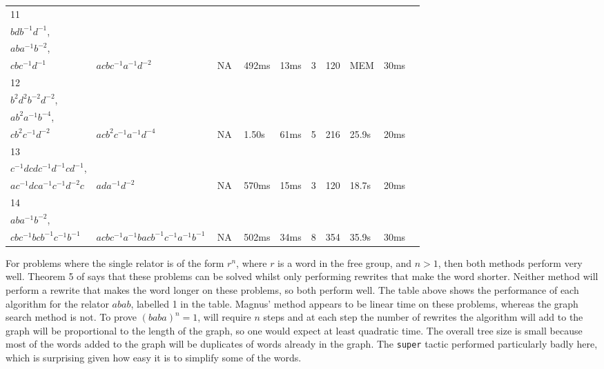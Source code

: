 \documentclass[12pt]{article} %
\theoremstyle{definition}
\theoremstyle{definition}
\theoremstyle{definition}
\theoremstyle{definition}
\begin{document}
\begin{landscape}
\begin{longtable}[!h]{l|l|l|lll|llll|l|l}
  11 & \begin{tabular}[c]{@{}l@{}}$aca^{-1}c^{-1}$,\\ $bdb^{-1}d^{-1}$,\\ $aba^{-1}b^{-2}$,\\ $cbc^{-1}d^{-1}$\end{tabular} & $acbc^{-1}a^{-1}d^{-2}$ & \multicolumn{3}{c|}{NA} & 492ms & 13ms & 3 & 120 & MEM & 30ms \\ \hline
  12 & \begin{tabular}[c]{@{}l@{}}$aca^{-1}c^{-1}$,\\ $b^2d^2b^{-2}d^{-2}$,\\ $ab^2a^{-1}b^{-4}$,\\ $cb^2c^{-1}d^{-2}$\end{tabular} & $acb^2c^{-1}a^{-1}d^{-4}$ & \multicolumn{3}{c|}{NA} & 1.50s & 61ms & 5 & 216 & 25.9s & 20ms \\ \hline
  13 & \begin{tabular}[c]{@{}l@{}}$aca^{-1}c^{-1}$,\\ $c^{-1}dcdc^{-1}d^{-1}cd^{-1}$,\\ $ac^{-1}dca^{-1}c^{-1}d^{-2}c$\end{tabular} & $ada^{-1}d^{-2}$ & \multicolumn{3}{c|}{NA} & 570ms & 15ms & 3 & 120 & 18.7s & 20ms \\ \hline
  14 & \begin{tabular}[c]{@{}l@{}}$aca^{-1}c^{-1}$,\\ $aba^{-1}b^{-2}$,\\ $cbc^{-1}bcb^{-1}c^{-1}b^{-1}$\end{tabular} & $acbc^{-1}a^{-1}bacb^{-1}c^{-1}a^{-1}b^{-1}$ & \multicolumn{3}{c|}{NA} & 502ms & 34ms & 8 & 354 & 35.9s & 30ms
  \label{tab:my-table}\\
  \end{longtable}
\end{landscape}
\pagebreak

For problems where the single relator is of the form $r^n$, where
$r$ is a word in the free group, and $n > 1$, then both methods perform
very well. Theorem 5 of \cite{PutmanOneRelator} says that
these problems can be solved whilst only performing rewrites that
make the word shorter. Neither method will perform a rewrite that
makes the word longer on these problems, so both perform well. The table
above shows the performance of each algorithm for the relator $abab$,
labelled 1 in the table.
Magnus' method appears to be linear time on these problems, whereas
the graph search method is not. To prove $(baba)^n = 1$, will require
$n$ steps and at each step the number of rewrites the algorithm
will add to the graph will be proportional to the length of the graph,
so one would expect at least quadratic time. The overall tree size
is small because most of the words added to the graph will
be duplicates of words already in the graph. The \lstinline{super} tactic performed particularly
badly here, which is surprising given how easy it is to simplify some of the words.
\end{document}
